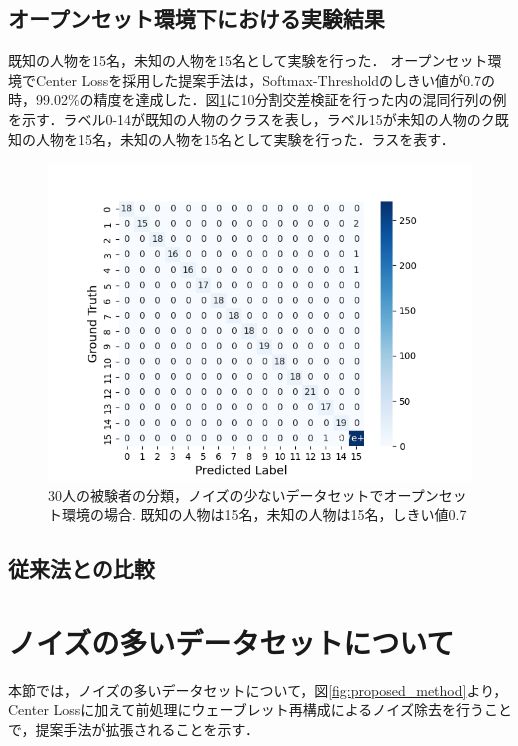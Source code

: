 \subsection{オープンセット環境下における実験結果}
既知の人物を15名，未知の人物を15名として実験を行った．
オープンセット環境でCenter Lossを採用した提案手法は，Softmax-Thresholdのしきい値が0.7の時，99.02\%の精度を達成した．図\ref{fig:30open-conf}に10分割交差検証を行った内の混同行列の例を示す．ラベル0-14が既知の人物のクラスを表し，ラベル15が未知の人物のク既知の人物を15名，未知の人物を15名として実験を行った．ラスを表す．


\begin{figure}[H]
\begin{center}
\includegraphics[width=\linewidth]{./fig/clean_dataset/cross_val_Fold0_threshold0.8_15_15.png}
\end{center}
\caption{30人の被験者の分類，ノイズの少ないデータセットでオープンセット環境の場合.
既知の人物は15名，未知の人物は15名，しきい値0.7}
\label{fig:30open-conf}
\end{figure}

\subsection{従来法との比較}


\section{ノイズの多いデータセットについて}
本節では，ノイズの多いデータセットについて，図\ref{fig:proposed_method}より，Center Lossに加えて前処理にウェーブレット再構成によるノイズ除去を行うことで，提案手法が拡張されることを示す．
